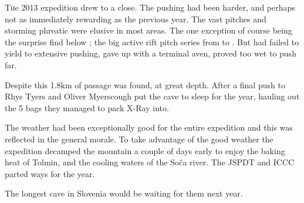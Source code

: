\thispagestyle{endchapter}

\begin{tcolorbox}

\vspace{80pt}
	\lettrine{T}{h}{e} 2013 expedition drew to a close. The pushing had been harder, 
	and perhaps not as immediately rewarding as the previous year. The vast pitches and storming phreatic were 
	elusive in most areas. The one exception of course being the surprise find below ; the big
	active rift pitch series from  to . But  had 
	failed to yield to extensive pushing,  gave up with a terminal aven, 
	proved too wet to push far. 
	
	Despite this 1.8km of passage was found, at great depth. After a final push to  
	Rhys Tyers and Oliver Myerscough put the cave to sleep for the year, hauling out the 5 bags they managed to 
	pack X-Ray into.
	
	The weather had been exceptionally good for the entire expedition and this was reflected in the general morale. 
	To take advantage of the good weather the expedition decamped the mountain a couple of days early to enjoy the 
	baking heat of Tolmin, and the cooling waters of the Soča river. The JSPDT and ICCC parted ways for the year.

	The longest cave in Slovenia would be waiting for them next year.

\end{tcolorbox} 
\BgThispage
